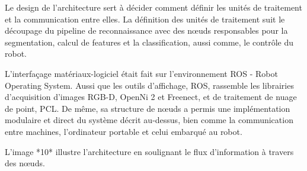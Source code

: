 Le design de l'architecture sert à décider comment définir les unités de traitement et la communication entre elles. La définition des unités de traitement suit le découpage du pipeline de reconnaissance avec des nœuds responsables pour la segmentation, calcul de features et la classification, aussi comme, le contrôle du robot.

L'interfaçage matériaux-logiciel était fait sur l'environnement ROS -
Robot Operating System. Aussi que les outils d'affichage, ROS, 
rassemble les librairies d'acquisition d'images RGB-D, OpenNi 2 et Freenect, et de traitement de nuage de point, PCL.
De même, sa structure de nœuds a permis une implémentation modulaire et direct du
système décrit au-dessus, bien comme la communication entre machines, l'ordinateur portable et celui embarqué au robot.

L'image *10* illustre l'architecture en soulignant le flux d'information à travers des nœuds.